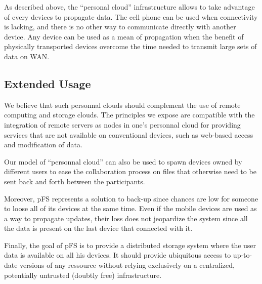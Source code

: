 As described above, the ``personal cloud'' infrastructure allows to
take advantage of every devices to propagate data. The cell phone can
be used when connectivity is lacking, and there is no other way to
communicate directly with another device. Any device can be used as a
mean of propagation when the benefit of physically transported devices
overcome the time needed to transmit large sets of data on WAN.

\subsection{Extended Usage}

We believe that such personnal clouds should complement the use of
remote computing and storage clouds. The principles we expose are
compatible with the integration of remote servers as nodes in one's
personnal cloud for providing services that are not available on
conventional devices, such as web-based access and modification of
data.

Our model of ``personnal cloud'' can also be used to spawn devices
owned by different users to ease the collaboration process on files that
otherwise need to be sent back and forth between the participants.

Moreover, pFS represents a solution to back-up since chances are low
for someone to loose all of its devices at the same time. Even if the
mobile devices are used as a way to propagate updates, their loss does not
jeopardize the system since all the data is present on the last device
that connected with it.

Finally, the goal of pFS is to provide a distributed storage system
where the user data is available on all his devices. It should provide
ubiquitous access to up-to-date versions of any ressource without
relying exclusively on a centralized, potentially untrusted (doubtly
free) infrastructure.


\endinput

\subsection {Existing Models}

As we are writing, new services are being introduced to the
market : they are distributed storage systems, with support for
disconnected operations. A local copy of the files is kept on every
device participating in the system. These products results in a user
experience close to what we are aiming at with pFS. Nevertheless, these
systems rely on the existence of a central server, always available,
where conflicts are detected. Figure \ref{OthModel} shows a diagram of
such existing solutions.

